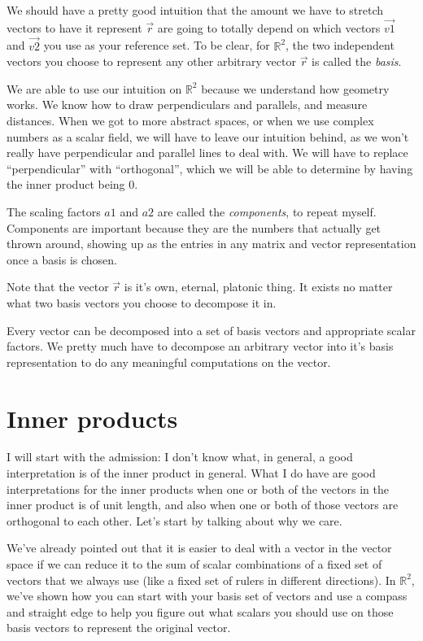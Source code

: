 \documentclass[
]{book}
\begin{document}
We should have a pretty good intuition that the amount we have to stretch vectors to have it represent \(\vec{r}\) are going to totally depend on which vectors \(\vec{v1}\) and \(\vec{v2}\) you use as your reference set. To be clear, for \(\mathbb{R}^2\), the two independent vectors you choose to represent any other arbitrary vector \(\vec{r}\) is called the \emph{basis}.

We are able to use our intuition on \(\mathbb{R}^2\) because we understand how geometry works. We know how to draw perpendiculars and parallels, and measure distances. When we got to more abstract spaces, or when we use complex numbers as a scalar field, we will have to leave our intuition behind, as we won't really have perpendicular and parallel lines to deal with. We will have to replace ``perpendicular'' with ``orthogonal'', which we will be able to determine by having the inner product being 0.

The scaling factors \(a1\) and \(a2\) are called the \emph{components}, to repeat myself. Components are important because they are the numbers that actually get thrown around, showing up as the entries in any matrix and vector representation once a basis is chosen.

Note that the vector \(\vec{r}\) is it's own, eternal, platonic thing. It exists no matter what two basis vectors you choose to decompose it in.

Every vector can be decomposed into a set of basis vectors and appropriate scalar factors. We pretty much have to decompose an arbitrary vector into it's basis representation to do any meaningful computations on the vector.

\hypertarget{inner-products}{%
\section{Inner products}\label{inner-products}}

I will start with the admission: I don't know what, in general, a good interpretation is of the inner product in general. What I do have are good interpretations for the inner products when one or both of the vectors in the inner product is of unit length, and also when one or both of those vectors are orthogonal to each other. Let's start by talking about why we care.

We've already pointed out that it is easier to deal with a vector in the vector space if we can reduce it to the sum of scalar combinations of a fixed set of vectors that we always use (like a fixed set of rulers in different directions). In \(\mathbb{R}^2\), we've shown how you can start with your basis set of vectors and use a compass and straight edge to help you figure out what scalars you should use on those basis vectors to represent the original vector.
\end{document}
